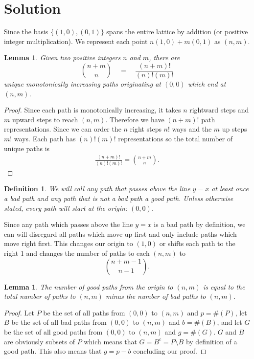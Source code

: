 \documentclass[letterpaper, 12pt]{article}
\newtheorem{lemma}[theorem]{Lemma}
\newtheorem{definition}[theorem]{Definition}
\begin{document}
\section*{Solution}
Since the basis $\{(1,0),(0,1)\}$ spans the entire lattice by addition (or positive integer multiplication). We represent each point $n(1,0) + m(0,1)$ as $(n,m)$.
\begin{lemma}\label{lem:totalPaths}
Given two positive integers $n$ and $m$, there are 
\begin{equation*}
    \binom{n+m}{n} \quad = \quad \frac{(n+m)!}{(n)!(m)!}
\end{equation*}
unique monotonically increasing paths originating at $(0,0)$ which end at $(n,m)$.
\end{lemma}
\begin{proof}
Since each path is monotonically increasing, it takes $n$ rightward steps and $m$ upward steps to reach $(n,m)$. Therefore we have $(n+m)!$ path representations. Since we can order the $n$ right steps $n!$ ways and the $m$ up steps $m!$ ways. Each path has $(n)!(m)!$ representations so the total number of unique paths is 
\begin{align*}
    \frac{(n+m)!}{(n)!(m)!} 
    =\binom{n+m}{n}.
\end{align*}
\end{proof}
\begin{definition}
We will call any path that passes above the line $y=x$ at least once a bad path and any path that is not a bad path a good path. Unless otherwise stated, every path will start at the origin: $(0,0)$.
\end{definition}
Since any path which passes above the line $y=x$ is a bad path by definition, we can will disregard all paths which move up first and only include paths which move right first. This changes our origin to $(1,0)$ or shifts each path to the right 1 and changes the number of paths to each $(n,m)$ to 
\begin{equation}\label{eq:modifiedTotal}
    \binom{n+m-1}{n-1}.
\end{equation}
\begin{lemma}\label{lem:goodPathEq}
    The number of good paths from the origin to $(n,m)$ is equal to the total number of paths to $(n,m)$ minus the number of bad paths to $(n,m)$.
\end{lemma}
\begin{proof}
    Let $P$ be the set of all paths from $(0,0)$ to $(n,m)$ and $p=\#(P)$, let $B$ be the set of all bad paths from $(0,0)$ to $(n,m)$ and $b=\#(B)$, and let $G$ be the set of all good paths from $(0,0)$ to $(n,m)$ and $g=\#(G)$. $G$ and $B$ are obviously subsets of $P$ which means that $G = B^c = P\setminus B$ by definition of a good path. This also means that $g = p-b$ concluding our proof. 
\end{proof}
\end{document}
